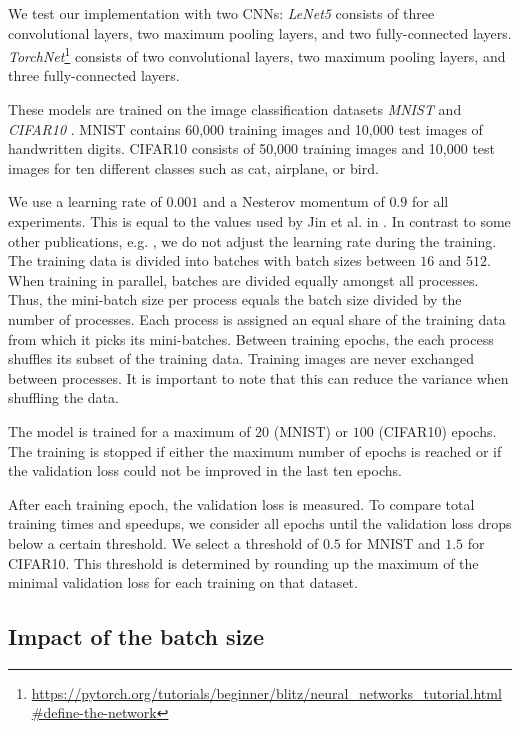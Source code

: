 \documentclass[conference,compsoc,a4paper]{IEEEtran}
\begin{document}
We test our implementation with two CNNs:
\emph{LeNet5} \cite{lecun1998gradient} consists of three convolutional layers, two maximum pooling layers, and two fully-connected layers.
\emph{TorchNet}\footnote{\url{https://pytorch.org/tutorials/beginner/blitz/neural_networks_tutorial.html\#define-the-network}} consists of two convolutional layers, two maximum pooling layers, and three fully-connected layers.

These models are trained on the image classification datasets \emph{MNIST} \cite{lecun1998gradient} and \emph{CIFAR10} \cite{krizhevsky2009CIFAR10}.
MNIST contains 60,000 training images and 10,000 test images of handwritten digits.
CIFAR10 consists of 50,000 training images and 10,000 test images for ten different classes such as cat, airplane, or bird.

We use a learning rate of $0.001$ and a Nesterov momentum of $0.9$ for all experiments.
This is equal to the values used by Jin et al. in \cite{jin2016-How-to-scale}.
In contrast to some other publications, e.g. \cite{jin2016-How-to-scale}, we do not adjust the learning rate during the training.
%
The training data is divided into batches with batch sizes between $16$ and $512$.
When training in parallel, batches are divided equally amongst all processes.
Thus, the mini-batch size per process equals the batch size divided by the number of processes.
%
Each process is assigned an equal share of the training data from which it picks its mini-batches.
Between training epochs, the each process shuffles its subset of the training data.
Training images are never exchanged between processes.
It is important to note that this can reduce the variance when shuffling the data.

The model is trained for a maximum of $20$ (MNIST) or $100$ (CIFAR10) epochs.
The training is stopped if either the maximum number of epochs is reached or if the validation loss could not be improved in the last ten epochs.

After each training epoch, the validation loss is measured.
To compare total training times and speedups, we consider all epochs until the validation loss drops below a certain threshold.
We select a threshold of $0.5$ for MNIST and $1.5$ for CIFAR10.
This threshold is determined by rounding up the maximum of the minimal validation loss for each training on that dataset.


\subsection{Impact of the batch size} %
\label{sub:impact_of_the_batch_size}
\end{document}
